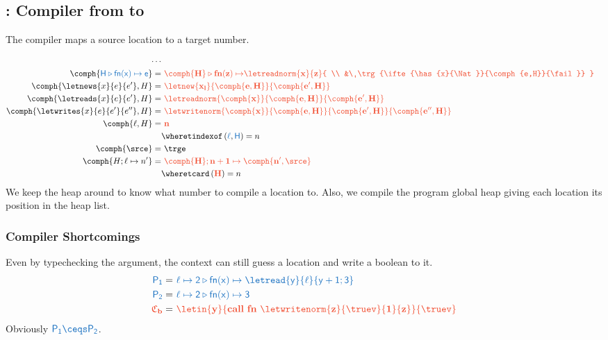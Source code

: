 \documentclass{article}
\theoremstyle{definition}
\begin{document}
\subsection{\comph{\cdot}: Compiler from \Sh to \Th}
The compiler maps a source location to a target number.

\begin{align*}
	\cdots&
	\\
	\comph{\src{H\triangleright fn(x)\mapsto e}} =&\ 
		\trg{
			\begin{aligned}[t]
				\trg{\comph{H}\triangleright fn(z)\mapsto }
				&
				\letreadnorm{
					\trg{x}
				}{
					\trg{z}
				}{
				\\
				&\
					\trg{\ifte{\has{x}{\Nat}}{\comph{e,H}}{\fail}}
				}
			\end{aligned}
		}
	\\
	\comph{\letnews{x}{e}{e'},H} = &\ 
		\trg{
				\letnew{
					\trg{x_l}
				}{
					\comph{e,H}
				}{
					\comph{e',H}
				}	
		}
	\\
	\comph{\letreads{x}{e}{e'},H} = &\ 
		\trg{
					\letreadnorm{
						\comph{x}
					}{
						\comph{e,H}
					}{
						\comph{e',H}
					}
		}
	\\
	\comph{\letwrites{x}{e}{e'}{e''},H} = &\ 
		\trg{
					\letwritenorm{
						\comph{x}
					}{
						\comph{e,H}
					}{
						\comph{e',H}	
					}{
						\comph{e'',H}
					}
		}
	\\
	\comph{\ell,H} =&\
		\trg{n}
	\\
		&
		\wheret \fun{indexof}{\src{\ell},\src{H}}=n
	\\
	\comph{\srce} =&\ \trge
	\\
	\comph{H; \ell\mapsto n'} =&\
		\trg{\comph{H}; n+1\mapsto\comph{n',\srce}}
	\\
		&
		\wheret \fun{card}{\trg{H}}=n
\end{align*}
We keep the heap around to know what number to compile a location to.
Also, we compile the program global heap giving each location its position in the heap list.

\subsubsection{Compiler Shortcomings}
Even by typechecking the argument, the context can still guess a location and write a boolean to it.
\begin{align*}
	\src{P_1} =&\
		\src{\ell\mapsto 2 \triangleright fn(x)\mapsto \letread{y}{\ell}{y+1;3}}
	\\
	\src{P_2} =&\
		\src{\ell\mapsto 2 \triangleright fn(x)\mapsto 3}
	\\
	\trg{\ctx_b} =&\
		\trg{ \letin{y}{call~fn~ \letwritenorm{z}{\truev}{1}{z}}{ \truev } }
\end{align*}
Obviously $\src{P_1\ceqs P_2}$.
\end{document}

